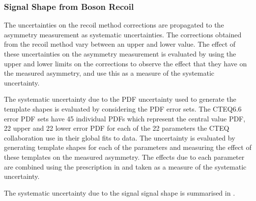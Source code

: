 \subsubsection{Signal \ETm Shape from Boson Recoil}

The uncertainties on the recoil method corrections are propagated to the
asymmetry measurement as systematic uncertainties.  The corrections obtained
from the recoil method vary between an upper and lower
value\cite{bauer2010modeling}. The effect of these uncertainties on the
asymmetry measurement is evaluated by using the upper and lower limits on the
corrections to observe the effect that they have on the measured asymmetry, and
use this as a measure of the systematic uncertainty.

The systematic uncertainty due to the {PDF} uncertainty used to generate the
template shapes is evaluated by considering the {PDF} error sets. The
CTEQ6.6\cite{lai2010vv} error {PDF} sets have 45 individual PDFs which represent
the central value {PDF}, 22 upper and 22 lower error {PDF} for each of the 22
parameters the CTEQ collaboration use in their global fits to data.  The
uncertainty is evaluated by generating template shapes for each of the
parameters and measuring the effect of these templates on the measured
asymmetry. The effects due to each parameter are combined using the
prescription in  and taken as a measure of the
systematic uncertainty.

The systematic uncertainty due to the signal \ETm signal shape is summarised in
.

